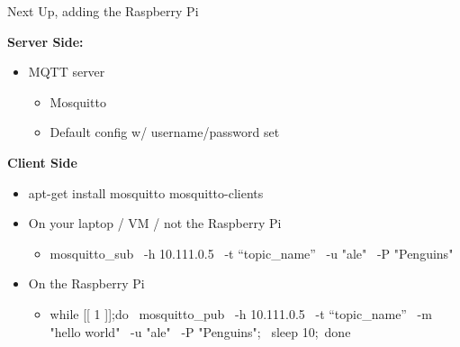 \begin{frame}
	{Next Up, adding the Raspberry Pi}

	\begin{multicols}{2}
		\textbf{Server Side:}
		\begin{itemize}
			\item MQTT server
			\begin{itemize}
				\item Mosquitto
				\item Default config w/ username/password set
			\end{itemize}
		\end{itemize}

		\vfill\null
		\columnbreak

		\textbf{Client Side}
		\begin{itemize}
			\item \begin{raw}[fontsize=\small]
apt-get install mosquitto mosquitto-clients
\end{raw}
			\item {\small On your laptop / VM / not the Raspberry Pi}
			\begin{itemize}
				\item \begin{raw}[fontsize=\small]
mosquitto_sub \
	-h 10.111.0.5 \
	-t “topic_name” \
	-u "ale" \
	-P "Penguins"
\end{raw}
			\end{itemize}
			\item {\small On the Raspberry Pi}
			\begin{itemize}
				\item \begin{raw}[fontsize=\small]
while [[ 1 ]];do \
	mosquitto_pub \
	-h 10.111.0.5 \
	-t “topic_name” \
	-m "hello world" \
	-u "ale" \
	 -P "Penguins"; \
	sleep 10;\
done
\end{raw}
			\end{itemize}
		\end{itemize}
	\end{multicols}

\end{frame}

\cprotect\note{
}

